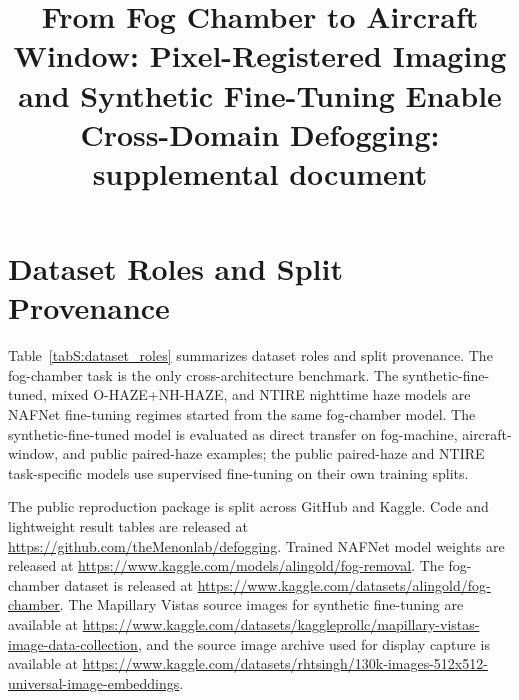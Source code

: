 \documentclass[9pt]{osa-supplemental-document}
\title{From Fog Chamber to Aircraft Window: Pixel-Registered Imaging and Synthetic Fine-Tuning Enable Cross-Domain Defogging: supplemental document}
\author{} %
\begin{document}
\maketitle

\section{Dataset Roles and Split Provenance}

Table~\ref{tabS:dataset_roles} summarizes dataset roles and split provenance. The fog-chamber task is the only cross-architecture benchmark. The synthetic-fine-tuned, mixed O-HAZE+NH-HAZE, and NTIRE nighttime haze models are NAFNet fine-tuning regimes started from the same fog-chamber model. The synthetic-fine-tuned model is evaluated as direct transfer on fog-machine, aircraft-window, and public paired-haze examples; the public paired-haze and NTIRE task-specific models use supervised fine-tuning on their own training splits.

The public reproduction package is split across GitHub and Kaggle. Code and lightweight result tables are released at \url{https://github.com/theMenonlab/defogging}. Trained NAFNet model weights are released at \url{https://www.kaggle.com/models/alingold/fog-removal}. The fog-chamber dataset is released at \url{https://www.kaggle.com/datasets/alingold/fog-chamber}. The Mapillary Vistas source images for synthetic fine-tuning are available at \url{https://www.kaggle.com/datasets/kaggleprollc/mapillary-vistas-image-data-collection}, and the source image archive used for display capture is available at \url{https://www.kaggle.com/datasets/rhtsingh/130k-images-512x512-universal-image-embeddings}.
\end{document}

